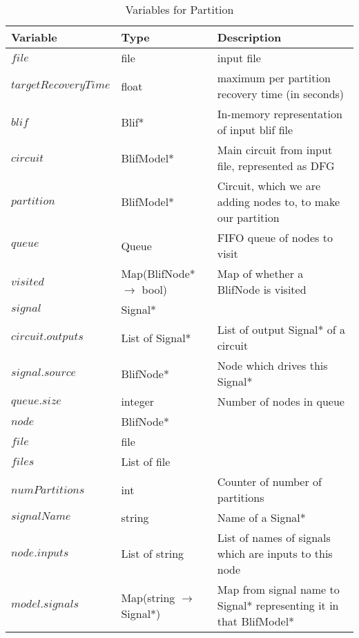 \documentclass[12pt,draft,oneside]{article} %
\begin{document}
\begin{table}
    \begin{center}
        \begin{tabularx}{\linewidth}{llX}
        \toprule
        Variable & Type & Description\\
        \midrule
        $file$ & file  & input file\\
        $targetRecoveryTime$ & float & maximum per partition recovery time (in seconds)\\
        $blif$ & Blif* & In-memory representation of input blif file\\
        $circuit$ &  BlifModel* & Main circuit from input file, represented as DFG\\
        $partition$ &  BlifModel* & Circuit, which we are adding nodes to, to make our partition\\
        $queue$ & Queue & FIFO queue of nodes to visit\\
        $visited$ &  Map(BlifNode*$\to$ bool)& Map of whether a BlifNode is visited\\
        $signal$ & Signal* & \\
        $circuit.outputs$ & List of Signal* & List of output Signal* of a circuit\\
        $signal.source$ & BlifNode* & Node which drives this Signal*\\
        $queue.size$ & integer & Number of nodes in queue\\
        $node$ & BlifNode* & \\
        $file$ & file & \\
        $files$ & List of file & \\
        $numPartitions$ & int & Counter of number of partitions\\
        $signalName$ & string & Name of a Signal*\\
        $node.inputs$ & List of string & List of names of signals which are inputs to this node\\
        $model.signals$ & Map(string $\to$ Signal*) & Map from signal name to Signal* representing it in that BlifModel*\\
        \bottomrule
        \end{tabularx}
        \caption{Variables for Partition}
        \label{varPart}
    \end{center}
\end{table}
\end{document}
